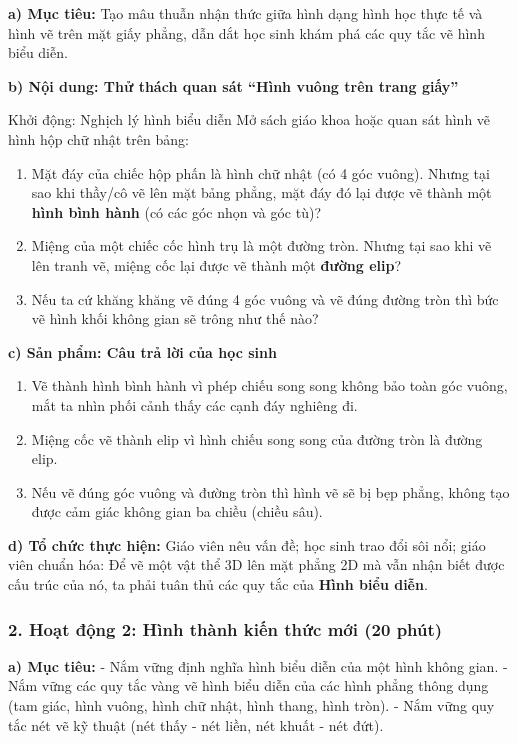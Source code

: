 \documentclass[12pt, a4paper]{article}
\begin{document}
\noindent \textbf{a) Mục tiêu:}
Tạo mâu thuẫn nhận thức giữa hình dạng hình học thực tế và hình vẽ trên mặt giấy phẳng, dẫn dắt học sinh khám phá các quy tắc vẽ hình biểu diễn.

\noindent \textbf{b) Nội dung: Thử thách quan sát ``Hình vuông trên trang giấy''}
\begin{pedabox}{Khởi động: Nghịch lý hình biểu diễn}
Mở sách giáo khoa hoặc quan sát hình vẽ hình hộp chữ nhật trên bảng:
\begin{enumerate}[leftmargin=0.6cm]
    \item Mặt đáy của chiếc hộp phấn là hình chữ nhật (có 4 góc vuông). Nhưng tại sao khi thầy/cô vẽ lên mặt bảng phẳng, mặt đáy đó lại được vẽ thành một \textbf{hình bình hành} (có các góc nhọn và góc tù)?
    \item Miệng của một chiếc cốc hình trụ là một đường tròn. Nhưng tại sao khi vẽ lên tranh vẽ, miệng cốc lại được vẽ thành một \textbf{đường elip}?
    \item Nếu ta cứ khăng khăng vẽ đúng 4 góc vuông và vẽ đúng đường tròn thì bức vẽ hình khối không gian sẽ trông như thế nào?
\end{enumerate}
\end{pedabox}

\noindent \textbf{c) Sản phẩm: Câu trả lời của học sinh}
\begin{enumerate}[leftmargin=0.6cm]
    \item Vẽ thành hình bình hành vì phép chiếu song song không bảo toàn góc vuông, mắt ta nhìn phối cảnh thấy các cạnh đáy nghiêng đi.
    \item Miệng cốc vẽ thành elip vì hình chiếu song song của đường tròn là đường elip.
    \item Nếu vẽ đúng góc vuông và đường tròn thì hình vẽ sẽ bị bẹp phẳng, không tạo được cảm giác không gian ba chiều (chiều sâu).
\end{enumerate}

\noindent \textbf{d) Tổ chức thực hiện:}
Giáo viên nêu vấn đề; học sinh trao đổi sôi nổi; giáo viên chuẩn hóa: Để vẽ một vật thể 3D lên mặt phẳng 2D mà vẫn nhận biết được cấu trúc của nó, ta phải tuân thủ các quy tắc của \textbf{Hình biểu diễn}.

\subsubsection*{2. Hoạt động 2: Hình thành kiến thức mới (20 phút)}

\noindent \textbf{a) Mục tiêu:}
- Nắm vững định nghĩa hình biểu diễn của một hình không gian.
- Nắm vững các quy tắc vàng vẽ hình biểu diễn của các hình phẳng thông dụng (tam giác, hình vuông, hình chữ nhật, hình thang, hình tròn).
- Nắm vững quy tắc nét vẽ kỹ thuật (nét thấy - nét liền, nét khuất - nét đứt).
\end{document}
